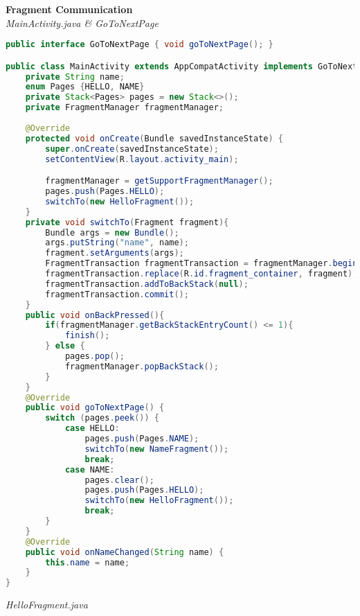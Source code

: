 \textbf{Fragment Communication} \\
\textit{MainActivity.java \& GoToNextPage}
\begin{lstlisting}[language=java]
public interface GoToNextPage { void goToNextPage(); }

public class MainActivity extends AppCompatActivity implements GoToNextPage, HelloFragment.OnNameChangeListener {
    private String name;
    enum Pages {HELLO, NAME}
    private Stack<Pages> pages = new Stack<>();
    private FragmentManager fragmentManager;
    
    @Override
    protected void onCreate(Bundle savedInstanceState) {
        super.onCreate(savedInstanceState);
        setContentView(R.layout.activity_main);

        fragmentManager = getSupportFragmentManager();
        pages.push(Pages.HELLO);
        switchTo(new HelloFragment());
    }
    private void switchTo(Fragment fragment){
        Bundle args = new Bundle();
        args.putString("name", name);
        fragment.setArguments(args);
        FragmentTransaction fragmentTransaction = fragmentManager.beginTransaction();
        fragmentTransaction.replace(R.id.fragment_container, fragment);
        fragmentTransaction.addToBackStack(null);
        fragmentTransaction.commit();
    }
    public void onBackPressed(){
        if(fragmentManager.getBackStackEntryCount() <= 1){
            finish();
        } else {
            pages.pop();
            fragmentManager.popBackStack();
        }
    }
    @Override
    public void goToNextPage() {
        switch (pages.peek()) {
            case HELLO:
                pages.push(Pages.NAME);
                switchTo(new NameFragment());
                break;
            case NAME:
                pages.clear();
                pages.push(Pages.HELLO);
                switchTo(new HelloFragment());
                break;
        }
    }
    @Override
    public void onNameChanged(String name) {
        this.name = name;
    }
}
\end{lstlisting}
\textit{HelloFragment.java}
